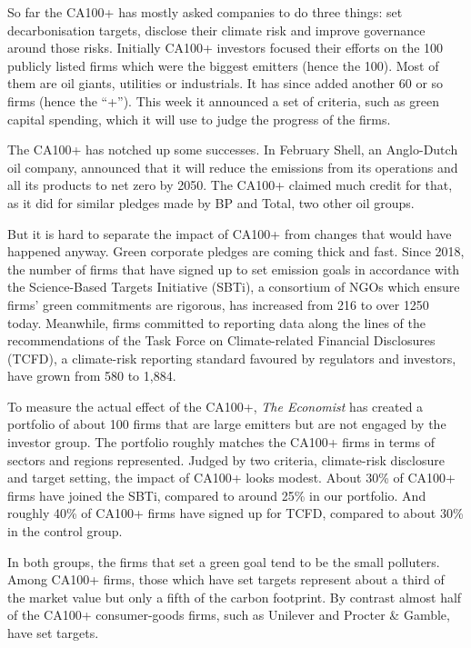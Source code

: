 \documentclass{article}
\begin{document}
So far the CA100+ has mostly asked companies to do three things: set decarbonisation targets, disclose their climate risk and improve governance around those risks. Initially CA100+ investors focused their efforts on the 100 publicly listed firms which were the biggest emitters (hence the 100). Most of them are oil giants, utilities or industrials. It has since added another 60 or so firms (hence the ``+''). This week it announced a set of criteria, such as green capital spending, which it will use to judge the progress of the firms. 

The CA100+ has notched up some successes. In February Shell, an Anglo-Dutch oil company, announced that it will reduce the emissions from its operations and all its products to net zero by 2050. The CA100+ claimed much credit for that, as it did for similar pledges made by BP and Total, two other oil groups. 

But it is hard to separate the impact of CA100+ from changes that would have happened anyway. Green corporate pledges are coming thick and fast. Since 2018, the number of firms that have signed up to set emission goals in accordance with the Science-Based Targets Initiative (SBTi), a consortium of NGOs which ensure firms' green commitments are rigorous, has increased from 216 to over 1250 today. Meanwhile, firms committed to reporting data along the lines of the recommendations of the Task Force on Climate-related Financial Disclosures (TCFD), a climate-risk reporting standard favoured by regulators and investors, have grown from 580 to 1,884. 

To measure the actual effect of the CA100+, \emph{The Economist} has created a portfolio of about 100 firms that are large emitters but are not engaged by the investor group. The portfolio roughly matches the CA100+ firms in terms of sectors and regions represented. Judged by two criteria, climate-risk disclosure and target setting, the impact of CA100+ looks modest. About 30\% of CA100+ firms have joined the SBTi, compared to around 25\% in our portfolio. And roughly 40\% of CA100+ firms have signed up for TCFD, compared to about 30\% in the control group. 

In both groups, the firms that set a green goal tend to be the small polluters. Among CA100+ firms, those which have set targets represent about a third of the market value but only a fifth of the carbon footprint. By contrast almost half of the CA100+ consumer-goods firms, such as Unilever and Procter \& Gamble, have set targets. 
\end{document}

